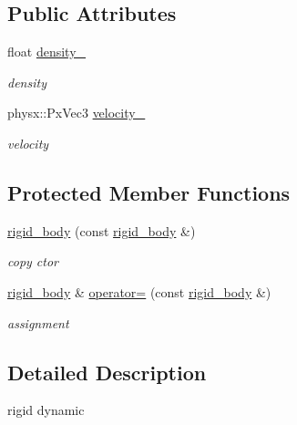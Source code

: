 \subsection*{Public Attributes}
\begin{DoxyCompactItemize}
\item 
float \hyperlink{classnebula_1_1content_1_1actor_1_1physics_1_1rigid__body_a2d5df055b3d881f8ce87cf078261c142}{density\_\-}
\begin{DoxyCompactList}\small\item\em density \item\end{DoxyCompactList}\item 
physx::PxVec3 \hyperlink{classnebula_1_1content_1_1actor_1_1physics_1_1rigid__body_abefc32c16035c731bcdfaa4deedbfb78}{velocity\_\-}
\begin{DoxyCompactList}\small\item\em velocity \item\end{DoxyCompactList}\end{DoxyCompactItemize}
\subsection*{Protected Member Functions}
\begin{DoxyCompactItemize}
\item 
\hyperlink{classnebula_1_1content_1_1actor_1_1physics_1_1rigid__body_ac507978a93f6acbf1d81f41cffbc1c04}{rigid\_\-body} (const \hyperlink{classnebula_1_1content_1_1actor_1_1physics_1_1rigid__body}{rigid\_\-body} \&)
\begin{DoxyCompactList}\small\item\em copy ctor \item\end{DoxyCompactList}\item 
\hyperlink{classnebula_1_1content_1_1actor_1_1physics_1_1rigid__body}{rigid\_\-body} \& \hyperlink{classnebula_1_1content_1_1actor_1_1physics_1_1rigid__body_afeaa8197cacc9b3f9e2b618f0ee0443b}{operator=} (const \hyperlink{classnebula_1_1content_1_1actor_1_1physics_1_1rigid__body}{rigid\_\-body} \&)
\begin{DoxyCompactList}\small\item\em assignment \item\end{DoxyCompactList}\end{DoxyCompactItemize}


\subsection{Detailed Description}
rigid dynamic 

